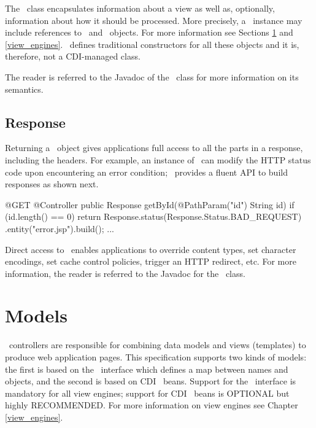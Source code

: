 The \Viewable\ class encapsulates information about a view as well as, optionally, information 
about how it  should be processed. More precisely, a \Viewable\ instance may include references 
to \Models\ and \ViewEngine\ objects. For more information see Sections \ref{models} and \ref{view_engines}. 
\Viewable\ defines traditional constructors for all these objects and it is, therefore, not a 
CDI-managed class.

The reader is referred to the Javadoc of the \Viewable\ class for more information on its semantics.

\subsection{Response}
\label{response}

Returning a \Response\ object gives applications full access to all the parts in a response, 
including the headers. For example, an instance of  \Response\ can modify the HTTP status
code upon encountering an error condition; \jaxrs\ provides a fluent API to build responses
as shown next.

\begin{listing}{1}
@GET
@Controller
public Response getById(@PathParam("id") String id) {
    if (id.length() == 0) {
   	    return Response.status(Response.Status.BAD_REQUEST)
   	                   .entity("error.jsp").build();
    } 
    ...
}
\end{listing}

Direct access to \Response\ enables applications to override content types, set character
encodings, set cache control policies, trigger an HTTP redirect, etc. For more information, 
the reader is referred to the Javadoc for the \Response\ class.

\section{Models}
\label{models}

\mvc\ controllers are responsible for combining data models and views (templates) to 
produce web application pages. This specification supports two kinds of models: the
first is based on the \Models\ interface which defines a map between names and
objects, and the second is based on CDI \Named\ beans. Support for the \Models\ 
interface is mandatory for all view engines; support for CDI \Named\ beans is
OPTIONAL but highly RECOMMENDED. For more information on view engines see
Chapter \ref{view_engines}.

